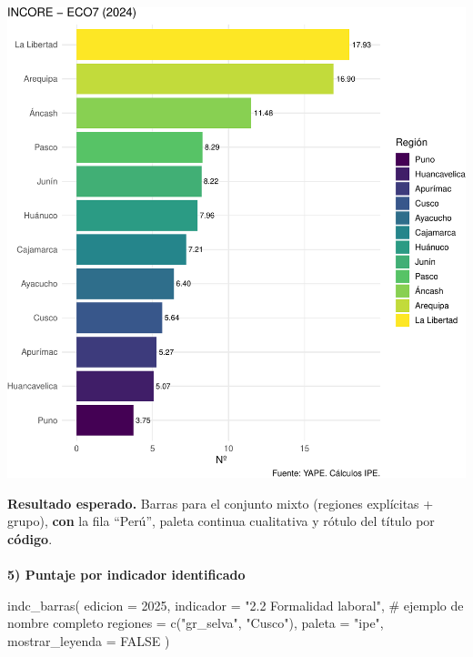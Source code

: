 \documentclass[
  11pt,
  letterpaper,
  DIV=11,
  numbers=noendperiod]{scrartcl}
\makeatletter
\let\oldparagraph\paragraph
\renewcommand{\paragraph}{
    \@ifstar
      \xxxParagraphStar
      \xxxParagraphNoStar
  }
\newcommand{\xxxParagraphStar}[1]{\oldparagraph*{#1}\mbox{}}
\newcommand{\xxxParagraphNoStar}[1]{\oldparagraph{#1}\mbox{}}
\newenvironment{Shaded}{\begin{snugshade}}{\end{snugshade}}
\newcommand{\AttributeTok}[1]{\textcolor[rgb]{0.40,0.45,0.13}{#1}}
\newcommand{\CommentTok}[1]{\textcolor[rgb]{0.37,0.37,0.37}{#1}}
\newcommand{\ConstantTok}[1]{\textcolor[rgb]{0.56,0.35,0.01}{#1}}
\newcommand{\DecValTok}[1]{\textcolor[rgb]{0.68,0.00,0.00}{#1}}
\newcommand{\FunctionTok}[1]{\textcolor[rgb]{0.28,0.35,0.67}{#1}}
\newcommand{\NormalTok}[1]{\textcolor[rgb]{0.00,0.23,0.31}{#1}}
\newcommand{\StringTok}[1]{\textcolor[rgb]{0.13,0.47,0.30}{#1}}
\makeatother
\begin{document}
\includegraphics{Manual_files/figure-pdf/unnamed-chunk-76-1.pdf}

\textbf{Resultado esperado.} Barras para el conjunto mixto (regiones
explícitas + grupo), \textbf{con} la fila ``Perú'', paleta continua
cualitativa y rótulo del título por \textbf{código}.

\paragraph{\texorpdfstring{\textbf{5) Puntaje por indicador
identificado}}{5) Puntaje por indicador identificado}}\label{puntaje-por-indicador-identificado}

\begin{Shaded}
\begin{Highlighting}[]
\FunctionTok{indc\_barras}\NormalTok{(}
  \AttributeTok{edicion   =} \DecValTok{2025}\NormalTok{,}
  \AttributeTok{indicador =} \StringTok{"2.2 Formalidad laboral"}\NormalTok{,  }\CommentTok{\# ejemplo de nombre completo}
  \AttributeTok{regiones  =} \FunctionTok{c}\NormalTok{(}\StringTok{"gr\_selva"}\NormalTok{, }\StringTok{"Cusco"}\NormalTok{),}
  \AttributeTok{paleta    =} \StringTok{"ipe"}\NormalTok{,}
  \AttributeTok{mostrar\_leyenda =} \ConstantTok{FALSE}
\NormalTok{)}
\end{Highlighting}
\end{Shaded}
\end{document}
